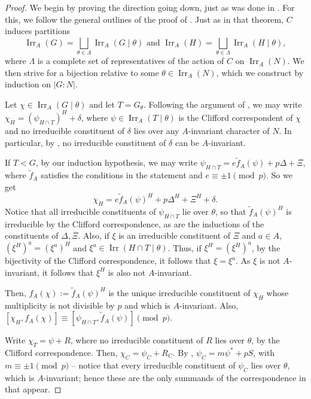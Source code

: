 \documentclass[12pt]{amsart}
\DeclareMathOperator{\Irr}{Irr}
\theoremstyle{remark}
\theoremstyle{definition}
\theoremstyle{plain}
\theoremstyle{definition}
\numberwithin{equation}{section}
\begin{document}
\begin{proof}
	We begin by proving the direction going down, just as was done in . For this, we follow the general outlines of the proof of \cite[Theorem E]{RelativeGlauberman}. Just as in that theorem, $C$ induces partitions
	\begin{equation*}
		\Irr_A(G) = \bigsqcup_{\theta \in \Lambda} \Irr_A(G \mid \theta) \text{ and } \Irr_A(H) = \bigsqcup_{\theta \in \Lambda} \Irr_A(H \mid \theta),
	\end{equation*}
	where $\Lambda$ is a complete set of representatives of the action of $C$ on $\Irr_A(N)$. We then strive for a bijection relative to some $\theta \in \Irr_A(N)$, which we construct by induction on $|G:N|$.
	
	Let $\chi \in \Irr_A(G \mid \theta)$ and let $T = G_\theta$. Following the argument of \cite[Theorem E]{RelativeGlauberman}, we may write $\chi_H = (\psi_{H \cap T})^H + \delta$, where $\psi \in \Irr_A(T \mid \theta)$ is the Clifford correspondent of $\chi$ and no irreducible constituent of $\delta$ lies over any $A$-invariant character of $N$. In particular, by , no irreducible constituent of $\delta$ can be $A$-invariant.
	
	If $T < G$, by our induction hypothesis, we may write $\psi_{H \cap T} = e \tilde{f}_A(\psi) + p\Delta + \Xi$, where $\tilde{f}_A$ satisfies the conditions in the statement and $e \equiv \pm 1 \pmod{p}$. So we get
	\begin{equation*}
		\chi_H = e \tilde{f}_A(\psi)^H + p\Delta^H + \Xi^H + \delta.
	\end{equation*}
	Notice that all irreducible constituents of $\psi_{H\cap T}$ lie over $\theta$, so that $\tilde{f}_A(\psi)^H$ is irreducible by the Clifford correspondence, as are the inductions of the constituents of $\Delta, \Xi$. Also, if $\xi$ is an irreducible constituent of $\Xi$ and $a \in A$, $(\xi^H)^a = (\xi^a)^H$ and $\xi^a \in \Irr(H \cap T \mid \theta)$. Thus, if $\xi^H = (\xi^H)^a$, by the bijectivity of the Clifford correspondence, it follows that $\xi = \xi^a$. As $\xi$ is not $A$-invariant, it follows that $\xi^H$ is also not $A$-invariant.
	
	Then, $f_A(\chi) := \tilde{f}_A(\psi)^H$ is the unique irreducible constituent of $\chi_H$ whose multiplicity is not divisible by $p$ and which is $A$-invariant. Also, $[\chi_H, f_A(\chi)] \equiv [\psi_{H \cap T}, \tilde{f}_A(\psi)] \pmod{p}$.
	
	Write $\chi_T = \psi + R$, where no irreducible constituent of $R$ lies over $\theta$, by the Clifford correspondence. Then, $\chi_C = \psi_C + R_C$. By , $\psi_C = m\psi^* + pS$, with $m \equiv \pm 1 \pmod{p}$ -- notice that every irreducible constituent of $\psi_C$ lies over $\theta$, which is $A$-invariant; hence these are the only summands of the correspondence in  that appear. 
	

\end{proof}
\end{document}
